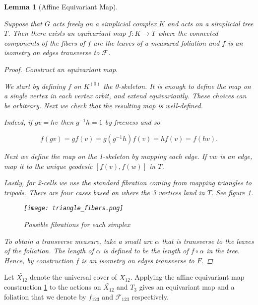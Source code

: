 \documentclass[12pt,parskip=full]{report}
\theoremstyle{plain}
\newtheorem{lem}[thm]{Lemma}
\theoremstyle{definition}
\begin{document}
\begin{lem}
    [Affine Equivariant Map]
    \label{lem:affineequivariantmap} 


    Suppose that \(G\) acts freely on a simplicial complex \(K\) and acts on a simplicial tree \(T\). Then there exists an equivariant map \(f: K \to T\) where the connected components of the fibers of \(f\) are the leaves of a measured foliation and \(f\) is an isometry on edges transverse to \(\mathscr{F}\).
    \begin{proof}
        Construct an equivariant map.

        We start by defining \(f\) on \(K^{(0)}\) the 0-skeleton. It is enough to define the map on a single vertex in each vertex orbit, and extend equivariantly. These choices can be arbitrary. Next we check that the resulting map is well-defined. 
        
        Indeed, if \(gv=hv\) then \(g^{-1} h = 1\) by freeness and so
        
        \[ f(gv) = gf(v) = g(g^{-1}h)f(v) = hf(v) = f(hv). \]
        
        Next we define the map on the 1-skeleton by mapping each edge. If \(vw\) is an edge, map it to the unique geodesic \([f(v), f(w)]\) in \(T\).
        
        Lastly, for 2-cells we use the standard fibration coming from mapping triangles to tripods. There are four cases based on where the 3 vertices land in \(T\). See figure \ref{fig:triangle_fibers}.
        
      
\begin{figure}[htp]
    \centering
    \texttt{[image: triangle\_fibers.png]}
    \caption{Possible fibrations for each simplex}
    \label{fig:triangle_fibers}
\end{figure}
        
        To obtain a transverse measure, take a small arc \(\alpha\) that is transverse to the leaves of the foliation. The length of \(\alpha\) is defined to be the length of \(f \circ \alpha\) in the tree. Hence, by construction \(f\) is an isometry on edges transverse to \(F\).
    \end{proof}
\end{lem}


Let \(\widetilde {X_{12}}\) denote the universal cover of \(X_{12}\).  Applying the affine equivariant map construction \ref{lem:affineequivariantmap} to the actions on \(\widetilde {X_{12}}\) and \(T_{3}\) gives an equivariant  map and a foliation that we denote by \(f_{123}\) and \(\mathscr{F}_{123}\) respectively.
\end{document}
